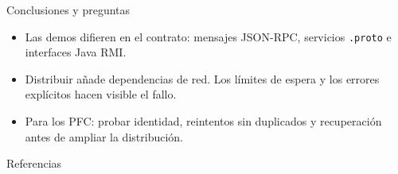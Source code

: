 \begin{frame}{Conclusiones y preguntas}\relax
\begin{itemize}
\item Las demos difieren en el contrato: mensajes JSON-RPC, servicios \texttt{.proto} e interfaces Java RMI.
\item Distribuir añade dependencias de red. Los límites de espera y los errores explícitos hacen visible el fallo.
\item Para los PFC: probar identidad, reintentos sin duplicados y recuperación antes de ampliar la distribución.
\end{itemize}
\end{frame}
\appendix
\begin{frame}[allowframebreaks]{Referencias}\relax
\renewcommand{\bibfont}{\footnotesize}
\nocite{zakutynskyi2022}
\printbibliography[heading=none]
\end{frame}
